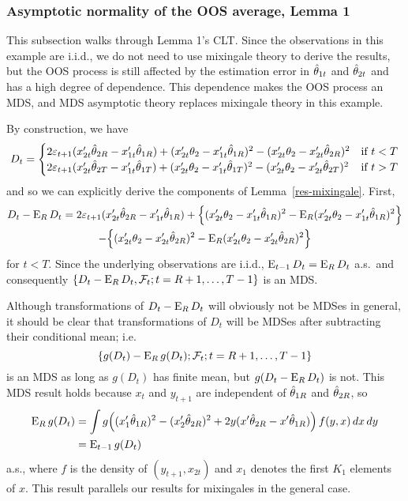 \documentclass[12pt]{article}
\begin{document}
\subsubsection*{Asymptotic normality of the OOS average, Lemma 1}

This subsection walks through Lemma 1's CLT. Since the observations in
this example are i.i.d., we do not need to use mixingale theory to
derive the results, but the OOS process is still affected by the
estimation error in $\hat\theta_{1t}$ and $\hat\theta_{2t}$ and has a high degree of
dependence. This dependence makes the OOS process an MDS, and MDS
asymptotic theory replaces mixingale theory in this example.

By construction, we have
\begin{equation*}
  D_t =
  \begin{cases}
    2 \varepsilon_{t+1} (x_{2t}'\hat\theta_{2R} - x_{1t}'\hat\theta_{1R})
    + (x_{2t}'\theta_2 - x_{1t}'\hat\theta_{1R})^2
    - (x_{2t}'\theta_2 - x_{2t}'\hat\theta_{2R})^2
    & \text{if } t < T \\
    2 \varepsilon_{t+1} (x_{2t}'\hat\theta_{2T} - x_{1t}'\hat\theta_{1T})
    + (x_{2t}'\theta_2 - x_{1t}'\hat\theta_{1T})^2
    - (x_{2t}'\theta_2 - x_{2t}'\hat\theta_{2T})^2
    & \text{if } t > T
  \end{cases}
\end{equation*}
and so we can explicitly derive the components of
Lemma~\ref{res-mixingale}. First,
\begin{multline*}
  D_t - \operatorname{E}_R D_t
  = 2 \varepsilon_{t+1} (x_{2t}'\hat\theta_{2R} - x_{1t}'\hat\theta_{1R})
  + \Big\{(x_{2t}'\theta_2 - x_{1t}'\hat\theta_{1R})^2
          - \operatorname{E}_R (x_{2t}'\theta_2 - x_{1t}'\hat\theta_{1R})^2 \Big\} \\
  - \Big\{(x_{2t}'\theta_2 - x_{2t}'\hat\theta_{2R})^2
          - \operatorname{E}_R (x_{2t}'\theta_2 - x_{2t}'\hat\theta_{2R})^2 \Big\}
\end{multline*}
for $t < T$. Since the underlying observations are i.i.d., $\operatorname{E}_{t-1}
D_t = \operatorname{E}_R D_t$ a.s.\ and consequently $\{D_t - \operatorname{E}_R D_t, \mathcal{F}_{t};
t=R+1,\dots,T-1\}$ is an MDS.

Although transformations of $D_t - \operatorname{E}_R D_t$ will obviously not be
MDSes in general, it should be clear that transformations of $D_t$
will be MDSes after subtracting their conditional mean; i.e.
\begin{equation*}
  \{g(D_t) - \operatorname{E}_R g(D_t); \mathcal{F}_t; t = R+1,\dots,T-1\}
\end{equation*}
is an MDS as long as
$g(D_t)$ has finite mean, but $g(D_t - \operatorname{E}_R D_t)$ is not. This MDS
result holds because $x_t$ and $y_{t+1}$ are independent of $\hat\theta_{1R}$
and $\hat\theta_{2R}$, so
\begin{equation*}\begin{split}
  \operatorname{E}_R g(D_t)
  &= \int g\Big((x_1'\hat\theta_{1R})^2 - (x_2'\hat\theta_{2R})^2
       + 2 y (x'\hat\theta_{2R} - x'\hat\theta_{1R})\Big) \, f(y, x) \, dx \, dy \\
  &= \operatorname{E}_{t-1} g(D_t)
\end{split}\end{equation*}
a.s., where $f$ is the density of $(y_{t+1}, x_{2t})$ and $x_1$
denotes the first $K_1$ elements of $x$. This result parallels our
results for mixingales in the general case.
\end{document}
